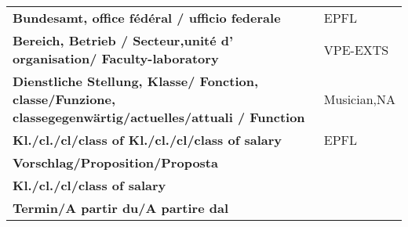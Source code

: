 \documentclass[
]{article}
\begin{document}
\begin{longtable}[]{@{}ll@{}}
\begin{minipage}[t]{0.45\columnwidth}\raggedright
\textbf{Bundesamt, office fédéral / ufficio federale}\strut
\end{minipage} & \begin{minipage}[t]{0.49\columnwidth}\raggedright
EPFL\strut
\end{minipage}\tabularnewline
\begin{minipage}[t]{0.45\columnwidth}\raggedright
\textbf{Bereich, Betrieb / Secteur,unité d' organisation/
Faculty-laboratory}\strut
\end{minipage} & \begin{minipage}[t]{0.49\columnwidth}\raggedright
VPE-EXTS\strut
\end{minipage}\tabularnewline
\begin{minipage}[t]{0.45\columnwidth}\raggedright
\textbf{Dienstliche Stellung, Klasse/ Fonction, classe/Funzione,
classegegenwärtig/actuelles/attuali / Function}\strut
\end{minipage} & \begin{minipage}[t]{0.49\columnwidth}\raggedright
Musician,NA\strut
\end{minipage}\tabularnewline
\begin{minipage}[t]{0.45\columnwidth}\raggedright
\textbf{Kl./cl./cl/class of Kl./cl./cl/class of salary}\strut
\end{minipage} & \begin{minipage}[t]{0.49\columnwidth}\raggedright
EPFL\strut
\end{minipage}\tabularnewline
\begin{minipage}[t]{0.45\columnwidth}\raggedright
\textbf{Vorschlag/Proposition/Proposta}\strut
\end{minipage} & \begin{minipage}[t]{0.49\columnwidth}\raggedright
\strut
\end{minipage}\tabularnewline
\begin{minipage}[t]{0.45\columnwidth}\raggedright
\textbf{Kl./cl./cl/class of salary}\strut
\end{minipage} & \begin{minipage}[t]{0.49\columnwidth}\raggedright
\strut
\end{minipage}\tabularnewline
\begin{minipage}[t]{0.45\columnwidth}\raggedright
\textbf{Termin/A partir du/A partire dal}\strut
\end{minipage} & \begin{minipage}[t]{0.49\columnwidth}\raggedright

\end{minipage}
\end{longtable}
\end{document}
